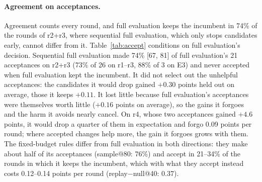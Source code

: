 \documentclass[11pt]{article}
\begin{document}
\paragraph{Agreement on acceptances.} Agreement counts every round, and full evaluation keeps the incumbent in 74\% of the rounds of r2+r3, where sequential full evaluation, which only stops candidates early, cannot differ from it. Table~\ref{tab:accept} conditions on full evaluation's decision. Sequential full evaluation made 74\% [67, 81] of full evaluation's 21 acceptances on r2+r3 (73\% of 26 on r1--r3, 88\% of 3 on E3) and never accepted when full evaluation kept the incumbent. It did not select out the unhelpful acceptances: the candidates it would drop gained $+0.30$ points held out on average, those it keeps $+0.11$. It lost little because full evaluation's acceptances were themselves worth little ($+0.16$ points on average), so the gains it forgoes and the harm it avoids nearly cancel. On r4, whose two acceptances gained $+4.6$ points, it would drop a quarter of them in expectation and forgo 0.09 points per round; where accepted changes help more, the gain it forgoes grows with them. The fixed-budget rules differ from full evaluation in both directions: they make about half of its acceptances (sample@80: 76\%) and accept in 21--34\% of the rounds in which it keeps the incumbent, which with what they accept instead costs 0.12--0.14 points per round (replay$-$null@40: 0.37).

\begin{table}[t]
\centering
\small
\setlength{\tabcolsep}{3pt}
\caption{Non-inferiority to full evaluation at smaller margins (one-sided bootstrap $p$, block bootstrap as in Table~\ref{tab:e1r}, not adjusted; 0.75 is the registered margin), and the expected share of rounds in which a rule makes full evaluation's choice. For keeping the incumbent, Agree is the share of rounds in which full evaluation keeps it. r1 is the exploratory set of the sequential rules; r4 has ten airline rounds and three blocks.}
\label{tab:margins}
\end{table}
\end{document}
